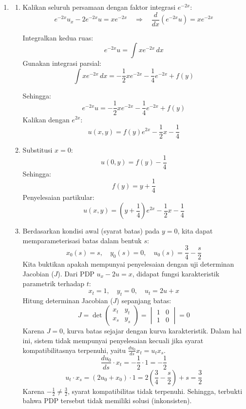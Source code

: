\documentclass{article}
\theoremstyle{definition}
\begin{document}
\begin{enumerate}
  \item \begin{enumerate}
          \item Kalikan seluruh persamaan dengan faktor integrasi \( e^{-2x} \):
                \[
                  e^{-2x}u_x - 2e^{-2x}u = xe^{-2x}
                  \quad \Rightarrow \quad
                  \frac{d}{dx}(e^{-2x}u) = xe^{-2x}
                \]

                Integralkan kedua ruas:
                \[
                  e^{-2x}u = \int xe^{-2x} \, dx
                \]
                Gunakan integrasi parsial:
                \[
                  \int xe^{-2x} \, dx = -\frac{1}{2}xe^{-2x} - \frac{1}{4}e^{-2x} + f(y)
                \]

                Sehingga:
                \[
                  e^{-2x}u = -\frac{1}{2}xe^{-2x} - \frac{1}{4}e^{-2x} + f(y)
                \]
                Kalikan dengan \( e^{2x} \):
                \[
                  u(x,y) = f(y)e^{2x} - \frac{1}{2}x - \frac{1}{4}
                \]
          \item Substitusi \(x = 0\):
                \[
                  u(0,y) = f(y) - \frac{1}{4}
                \]
                Sehingga:
                \[
                  f(y) = y + \frac{1}{4}
                \]
                Penyelesaian partikular:
                \[
                  u(x,y) = \left( y + \frac{1}{4} \right) e^{2x} - \frac{1}{2}x - \frac{1}{4}
                \]
          \item Berdasarkan kondisi awal (syarat batas) pada \(y=0\), kita dapat memparameterisasi batas dalam bentuk $s$:
                \[ x_0(s) = s, \quad y_0(s) = 0, \quad u_0(s) = \frac{3}{4} - \frac{s}{2} \]
                Kita buktikan apakah mempunyai penyelesaian dengan uji determinan Jacobian (\(J\)). Dari PDP \( u_x - 2u = x \), didapat fungsi karakteristik parametrik terhadap $t$:
                \[ x_t = 1, \quad y_t = 0, \quad u_t = 2u+x \]
                Hitung determinan Jacobian (\(J\)) sepanjang batas:
                \[
                  J = \det \begin{pmatrix} x_t & y_t \\ x_s & y_s \end{pmatrix} = \begin{vmatrix} 1 & 0 \\ 1 & 0 \end{vmatrix} = 0
                \]
                Karena \( J = 0 \), kurva batas sejajar dengan kurva karakteristik. Dalam hal ini, sistem tidak mempunyai penyelesaian kecuali jika syarat kompatibilitasnya terpenuhi, yaitu \( \frac{du_0}{ds} x_t = u_t x_s \).
                \[  \frac{du_0}{ds} \cdot x_t = -\frac{1}{2} \cdot 1 = -\frac{1}{2} \]
                \[ u_t \cdot x_s = (2u_0 + x_0) \cdot 1 = 2\left(\frac{3}{4} - \frac{s}{2}\right) + s = \frac{3}{2} \]
                Karena \( -\frac{1}{2} \neq \frac{3}{2} \), syarat kompatibilitas tidak terpenuhi. Sehingga, terbukti bahwa PDP tersebut tidak memiliki solusi (inkonsisten).


\end{enumerate}
\end{enumerate}
\end{document}
